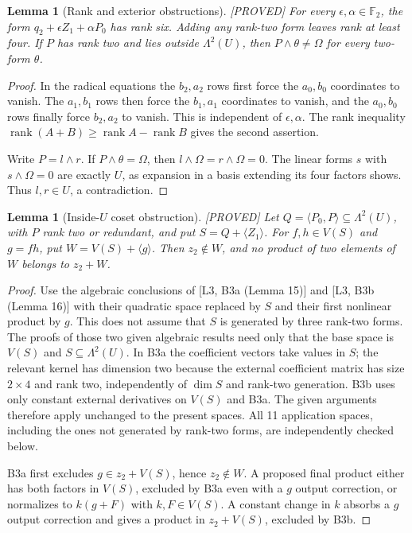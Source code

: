 \documentclass[11pt,a4paper]{article}
\newtheorem{lemma}[theorem]{Lemma}
\newcommand{\rk}{\operatorname{rank}}
\newcommand{\status}[1]{\hfill\textsf{[#1]}}
\begin{document}
\begin{lemma}[Rank and exterior obstructions]\label{lem:rankext}\status{PROVED}
For every $\epsilon,\alpha\in\mathbb F_2$, the form $q_2+\epsilon Z_1+\alpha P_0$ has rank six. Adding any rank-two form leaves rank at least four. If $P$ has rank two and lies outside $\Lambda^2(U)$, then $P\wedge\theta\ne\Omega$ for every two-form $\theta$.
\end{lemma}
\begin{proof}
In the radical equations the $b_2,a_2$ rows first force the $a_0,b_0$ coordinates to vanish. The $a_1,b_1$ rows then force the $b_1,a_1$ coordinates to vanish, and the $a_0,b_0$ rows finally force $b_2,a_2$ to vanish. This is independent of $\epsilon,\alpha$. The rank inequality $\rk(A+B)\ge\rk A-\rk B$ gives the second assertion.

Write $P=l\wedge r$. If $P\wedge\theta=\Omega$, then $l\wedge\Omega=r\wedge\Omega=0$. The linear forms $s$ with $s\wedge\Omega=0$ are exactly $U$, as expansion in a basis extending its four factors shows. Thus $l,r\in U$, a contradiction.
\end{proof}

\begin{lemma}[Inside-$U$ coset obstruction]\label{lem:coset}\status{PROVED}
Let $Q=\langle P_0,P\rangle\subseteq\Lambda^2(U)$, with $P$ rank two or redundant, and put $S=Q+\langle Z_1\rangle$. For $f,h\in V(S)$ and $g=fh$, put $W=V(S)+\langle g\rangle$. Then $z_2\notin W$, and no product of two elements of $W$ belongs to $z_2+W$.
\end{lemma}
\begin{proof}
Use the algebraic conclusions of [L3, B3a (Lemma 15)] and [L3, B3b (Lemma 16)] with their quadratic space replaced by $S$ and their first nonlinear product by $g$. This does not assume that $S$ is generated by three rank-two forms. The proofs of those two given algebraic results need only that the base space is $V(S)$ and $S\subseteq\Lambda^2(U)$. In B3a the coefficient vectors take values in $S$; the relevant kernel has dimension two because the external coefficient matrix has size $2\times4$ and rank two, independently of $\dim S$ and rank-two generation. B3b uses only constant external derivatives on $V(S)$ and B3a. The given arguments therefore apply unchanged to the present spaces. All 11 application spaces, including the ones not generated by rank-two forms, are independently checked below.

B3a first excludes $g\in z_2+V(S)$, hence $z_2\notin W$. A proposed final product either has both factors in $V(S)$, excluded by B3a even with a $g$ output correction, or normalizes to $k(g+F)$ with $k,F\in V(S)$. A constant change in $k$ absorbs a $g$ output correction and gives a product in $z_2+V(S)$, excluded by B3b.
\end{proof}
\end{document}
